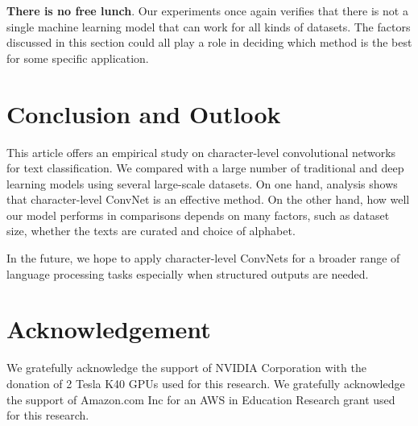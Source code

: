 \documentclass{article} \usepackage{nips15submit_e,times}
\begin{document}
\textbf{There is no free lunch}. Our experiments once again verifies that there is not a single machine learning model that can work for all kinds of datasets. The factors discussed in this section could all play a role in deciding which method is the best for some specific application.

\section{Conclusion and Outlook}

This article offers an empirical study on character-level convolutional networks for text classification. We compared with a large number of traditional and deep learning models using several large-scale datasets. On one hand, analysis shows that character-level ConvNet is an effective method. On the other hand, how well our model performs in comparisons depends on many factors, such as dataset size, whether the texts are curated and choice of alphabet.

In the future, we hope to apply character-level ConvNets for a broader range of language processing tasks especially when structured outputs are needed.

\section*{Acknowledgement}

We gratefully acknowledge the support of NVIDIA Corporation with the donation of 2 Tesla K40 GPUs used for this research. We gratefully acknowledge the support of Amazon.com Inc for an AWS in Education Research grant used for this research.


\small
{}
\end{document}
